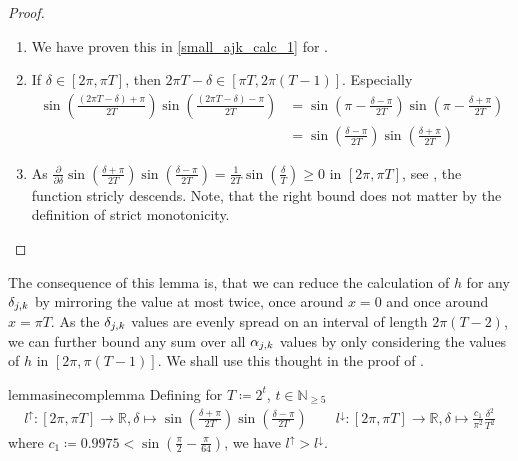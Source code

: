 \begin{proof}
    \begin{enumerate}[label=(\roman*)]
        \item We have proven this in \ref{small_ajk_calc_1} for .
        \item If \(\delta \in [2\pi, \pi T]\), then \(2 \pi T - \delta \in [\pi T, 2\pi(T-1)]\). Especially
        \begin{align}
            \sin\left(\frac{(2 \pi T - \delta) + \pi}{2T}\right)\sin\left(\frac{(2 \pi T - \delta) - \pi}{2T}\right) &= \sin\left(\pi - \frac{\delta - \pi}{2T}\right)\sin\left(\pi - \frac{\delta + \pi}{2T}\right)\\
            &= \sin\left(\frac{\delta - \pi}{2T}\right)\sin\left(\frac{\delta + \pi}{2T}\right)
        \end{align}
        \item As \(\frac{\partial}{\partial \delta} \sin\left(\frac{\delta+\pi}{2T}\right)\sin\left(\frac{\delta-\pi}{2T}\right) = \frac{1}{2T} \sin\left(\frac{\delta}{T}\right) \geq 0\) in \([2\pi, \pi T]\), see , the function stricly descends. Note, that the right bound does not matter by the definition of strict monotonicity.
    \end{enumerate}
\end{proof}

\begin{remark}
    The consequence of this lemma is, that we can reduce the calculation of \(h\) for any \(\delta_{j, k}\) by mirroring the value at most twice, once around \(x = 0\) and once around \(x = \pi T\). As the \(\delta_{j, k}\) values are evenly spread on an interval of length \(2\pi (T-2)\), we can further bound any sum over all \(\alpha_{j, k}\) values by only considering the values of \(h\) in \([2\pi, \pi (T-1)]\). We shall use this thought in the proof of .
\end{remark}

\begin{restatable}{lemma}{sinecomplemma} \label{sine_comp_lemma}
    Defining for \(T \coloneqq 2^t\), \(t \in \mathbb{N}_{\geq 5}\)
    \begin{align}
        l^\uparrow\colon [2\pi, \pi T] \to \mathbb{R}, \delta \mapsto \sin\left(\frac{\delta + \pi}{2T}\right)\sin\left(\frac{\delta - \pi}{2T}\right) \qquad l^\downarrow\colon [2\pi, \pi T] \to \mathbb{R}, \delta \mapsto \frac{c_1}{\pi^2} \frac{\delta^2}{T^2}
    \end{align}
    where \(c_1 \coloneqq 0.9975 < \sin\left(\frac{\pi}{2}-\frac{\pi}{64}\right)\), we have \(l^\uparrow > l^\downarrow\).
\end{restatable}


